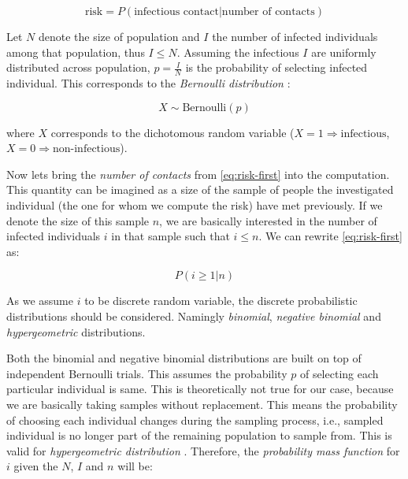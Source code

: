 \documentclass[
  digital, %
  oneside, %
  lof,     %
  lot,     %
]{fithesis4}
\begin{document}
\begin{equation}\label{eq:risk-first}
  \text{risk} = P(\text{infectious contact} | \text{number of contacts})
\end{equation}

Let $N$ denote the size of population and $I$ the number of infected
individuals among that population, thus $I \leq N$.
Assuming the infectious $I$ are uniformly distributed
across population, $p = \frac{I}{N}$ is the probability of
selecting infected individual.
This corresponds to the \textit{Bernoulli 
distribution} \cite{bernoulli-dist}:

\begin{equation}
  X \sim \text{Bernoulli} \left( p \right)
\end{equation}

where $X$ corresponds to the dichotomous random variable
($X = 1 \Rightarrow \text{infectious}$, $X = 0 \Rightarrow \text{non-infectious}$).

Now lets bring the \textit{number of contacts} from 
\eqref{eq:risk-first} into the computation.
This quantity can be imagined as a size of the sample of people
the investigated individual (the one for whom we compute the risk)
have met previously.
If we denote the size of this sample $n$, we are basically interested
in the number of infected individuals $i$ in that sample such 
that $i \leq n$. We can rewrite \eqref{eq:risk-first} as:

\begin{equation}\label{eq:risk-second}
  P(i \geq 1 | n)
\end{equation}

As we assume $i$ to be discrete random variable,
the discrete probabilistic distributions should be considered.
Namingly \textit{binomial}, \textit{negative binomial} and 
\textit{hypergeometric} distributions.

Both the binomial and negative binomial distributions
are built on top of independent Bernoulli trials.
This assumes the probability $p$ of selecting each particular
individual is same.
This is theoretically not true for our case, because we
are basically taking samples without replacement.
This means the probability of choosing each individual
changes during the sampling process, i.e., sampled 
individual is no longer part of the remaining
population to sample from. This is valid for
\textit{hypergeometric distribution} \cite{hypergeometric-dist}.
Therefore, the \textit{probability mass function} for $i$ given the
$N$, $I$ and $n$ will be:
\end{document}
